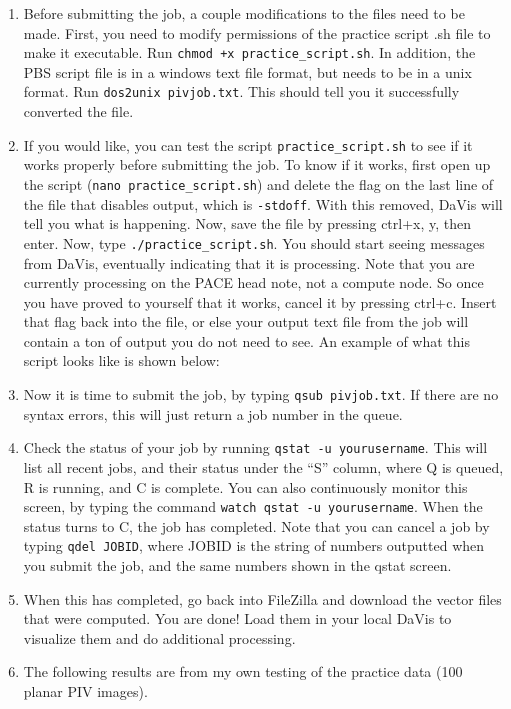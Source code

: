\documentclass{article}
\newcommand{\quotes}[1]{``#1''}
\begin{document}
\begin{enumerate}
		\item Before submitting the job, a couple modifications to the files need to be made.  First, you need to modify permissions of the practice script .sh file to make it executable.  Run \texttt{chmod +x practice\_script.sh}.  In addition, the PBS script file is in a windows text file format, but needs to be in a unix format.  Run \texttt{dos2unix pivjob.txt}.  This should tell you it successfully converted the file.
		\item If you would like, you can test the script \texttt{practice\_script.sh} to see if it works properly before submitting the job.  To know if it works, first open up the script (\texttt{nano practice\_script.sh}) and delete the flag on the last line of the file that disables output, which is \texttt{-stdoff}.  With this removed, DaVis will tell you what is happening.  Now, save the file by pressing ctrl+x, y, then enter.  Now, type \texttt{./practice\_script.sh}.  You should start seeing messages from DaVis, eventually indicating that it is processing.  Note that you are currently processing on the PACE head note, not a compute node.  So once you have proved to yourself that it works, cancel it by pressing ctrl+c.  Insert that flag back into the file, or else your output text file from the job will contain a ton of output you do not need to see.  An example of what this script looks like is shown below:
		
		
		\item Now it is time to submit the job, by typing \texttt{qsub pivjob.txt}.  If there are no syntax errors, this will just return a job number in the queue.
		\item Check the status of your job by running \texttt{qstat -u yourusername}.  This will list all recent jobs, and their status under the \quotes{S} column, where Q is queued, R is running, and C is complete.  You can also continuously monitor this screen, by typing the command \texttt{watch qstat -u yourusername}.  When the status turns to C, the job has completed.  Note that you can cancel a job by typing \texttt{qdel JOBID}, where JOBID is the string of numbers outputted when you submit the job, and the same numbers shown in the qstat screen.
		\item When this has completed, go back into FileZilla and download the vector files that were computed.  You are done!  Load them in your local DaVis to visualize them and do additional processing.
		\item The following results are from my own testing of the practice data (100 planar PIV images).
		

\end{enumerate}
\end{document}
